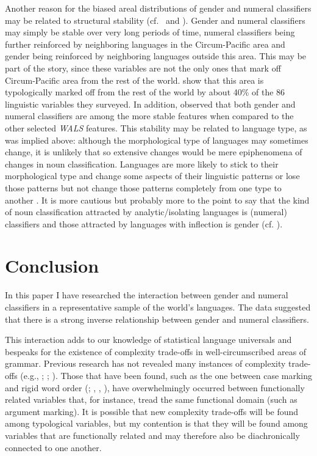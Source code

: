 \documentclass[output=collectionpaper]{langsci/langscibook}
\begin{document}
Another reason for the biased areal distributions of gender and numeral classifiers may be related to structural stability (cf.\  and \citealt[196--202]{Dahl2004}). Gender and numeral classifiers may simply be stable over very long periods of time, numeral classifiers being further reinforced by neighboring languages in the Circum-Pacific area and gender being reinforced by neighboring languages outside this area. This may be part of the story, since these variables are not the only ones that mark off Circum-Pacific area from the rest of the world. \citet{Bickel2006} show that this area is typologically marked off from the rest of the world by about 40\% of the 86 linguistic variables they surveyed. In addition, \citet[13]{Dediu2013} observed that both gender and numeral classifiers are among the more stable features when compared to the other selected \textit{WALS} features. This stability may be related to language type, as was implied above: although the morphological type of languages may sometimes change, it is unlikely that so extensive changes would be mere epiphenomena of changes in noun classification. Languages are more likely to stick to their morphological type and change some aspects of their linguistic patterns or lose those patterns but not change those patterns completely from one type to another \citep[346]{Passer2016b}. It is more cautious but probably more to the point to say that the kind of noun classification attracted by analytic/isolating languages is (numeral) classifiers and those attracted by languages with inflection is gender (cf. \citealt[137]{Corbett1991}).


\section{Conclusion}
\label{sec:Sinne:6}
\largerpage
In this paper I have researched the interaction between gender and numeral classifiers in a representative sample of the world's languages. The data suggested that there is a strong inverse relationship between gender and numeral classifiers.

This interaction adds to our knowledge of statistical language universals and bespeaks for the existence of complexity trade-offs in well-circumscribed areas of grammar. Previous research has not revealed many instances of complexity trade-offs (e.g., \citealt{Shosted2006}; \citealt{Maddieson2006}; \citealt{Miestamo2009}). Those that have been found, such as the one between case marking and rigid word order (\citealt{Siewierska1998}; \citealt{Sinnemaeki2008}, \citealt{Sinnemaeki2011}, \citealt{Sinnemaeki2014}), have overwhelmingly occurred between functionally related variables that, for instance, tread the same functional domain (such as argument marking). It is possible that new complexity trade-offs will be found among typological variables, but my contention is that they will be found among variables that are functionally related and may therefore also be diachronically connected to one another.
\end{document}
